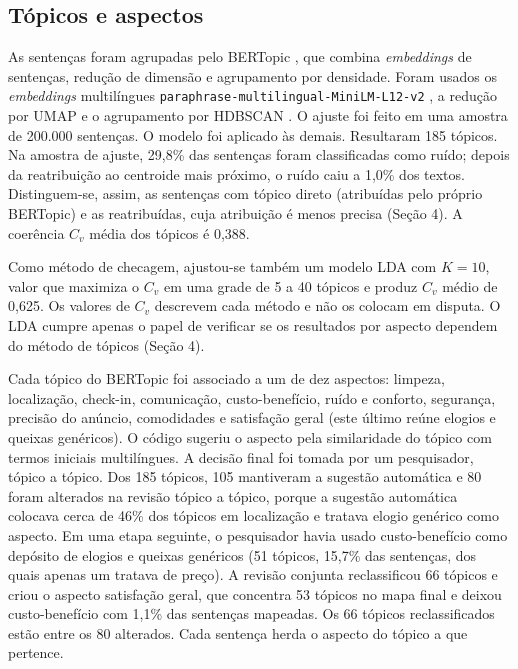 \subsection{Tópicos e aspectos}

As sentenças foram agrupadas pelo BERTopic \citep{grootendorst2022}, que combina \textit{embeddings} de sentenças, redução de dimensão e agrupamento por densidade. Foram usados os \textit{embeddings} multilíngues \texttt{paraphrase-\allowbreak multilingual-\allowbreak MiniLM-\allowbreak L12-\allowbreak v2} \citep{reimers2020}, a redução por UMAP \citep{mcinnes2018umap} e o agrupamento por HDBSCAN \citep{mcinnes2017}. O ajuste foi feito em uma amostra de 200.000 sentenças. O modelo foi aplicado às demais. Resultaram 185 tópicos. Na amostra de ajuste, 29,8\% das sentenças foram classificadas como ruído; depois da reatribuição ao centroide mais próximo, o ruído caiu a 1,0\% dos textos. Distinguem-se, assim, as sentenças com tópico direto (atribuídas pelo próprio BERTopic) e as reatribuídas, cuja atribuição é menos precisa (Seção 4). A coerência $C_v$ \citep{roder2015} média dos tópicos é 0,388.

Como método de checagem, ajustou-se também um modelo LDA \citep{blei2003} com $K = 10$, valor que maximiza o $C_v$ em uma grade de 5 a 40 tópicos e produz $C_v$ médio de 0,625. Os valores de $C_v$ descrevem cada método e não os colocam em disputa. O LDA cumpre apenas o papel de verificar se os resultados por aspecto dependem do método de tópicos (Seção 4).

Cada tópico do BERTopic foi associado a um de dez aspectos: limpeza, localização, check-in, comunicação, custo-benefício, ruído e conforto, segurança, precisão do anúncio, comodidades e satisfação geral (este último reúne elogios e queixas genéricos). O código sugeriu o aspecto pela similaridade do tópico com termos iniciais multilíngues. A decisão final foi tomada por um pesquisador, tópico a tópico. Dos 185 tópicos, 105 mantiveram a sugestão automática e 80 foram alterados na revisão tópico a tópico, porque a sugestão automática colocava cerca de 46\% dos tópicos em localização e tratava elogio genérico como aspecto. Em uma etapa seguinte, o pesquisador havia usado custo-benefício como depósito de elogios e queixas genéricos (51 tópicos, 15,7\% das sentenças, dos quais apenas um tratava de preço). A revisão conjunta reclassificou 66 tópicos e criou o aspecto satisfação geral, que concentra 53 tópicos no mapa final e deixou custo-benefício com 1,1\% das sentenças mapeadas. Os 66 tópicos reclassificados estão entre os 80 alterados. Cada sentença herda o aspecto do tópico a que pertence.

